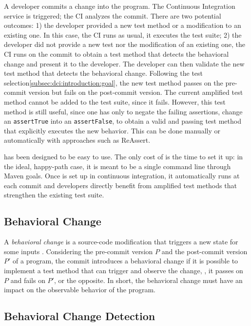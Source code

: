 A developer commits a change into the program.
The Continuous Integration service is triggered;
the CI analyzes the commit.
There are two potential outcomes:
1) the developer provided a new test method or a modification to an existing one. 
In this case, the CI runs as usual, \eg it executes the test suite;
2) the developer did not provide a new test nor the modification of an existing one, the CI runs \DCI on the commit to obtain a test method that detects the behavioral change and present it to the developer.
The developer can then validate the new test method that detects the behavioral change.
Following the test selection\autoref{subsec:dci:introduction:goal}, the new test method passes on the pre-commit version but fails on the post-commit version.
The current amplified test method cannot be added to the test suite, since it fails.
However, this test method is still useful, since one has only to negate the failing assertions, \eg change an \texttt{assertTrue} into an \texttt{assertFalse}, to obtain a valid and passing test method that explicitly executes the new behavior.
This can be done manually or automatically with approaches such as ReAssert\cite{ReAssert}.

\DCI has been designed to be easy to use.
The only cost of \DCI is the time to set it up: in the ideal, happy-path case, it is meant to be a single command line through Maven goals.
Once \DCI is set up in continuous integration, it automatically runs at each commit and developers directly benefit from amplified test methods that strengthen the existing test suite.

%
%
\subsection{Behavioral Change}
\label{subsec:dci:background:behavioral-change}

A \emph{behavioral change} is a source-code modification that triggers a new state for some inputs \cite{saff2004experimental}.
Considering the pre-commit version $P$ and the post-commit version $P'$ of a program, the commit introduces a behavioral change if it is possible to implement a test method that can trigger and observe the change, \ie, it passes on $P$ and fails on $P'$, or the opposite.
In short, the behavioral change must have an impact on the observable behavior of the program.

%
%
\subsection{Behavioral Change Detection}
\label{subsec:dci:background:behavioral-change-detection}


